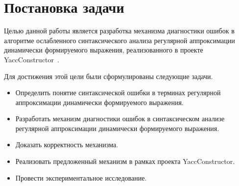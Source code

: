 \section{Постановка задачи}
Целью данной работы является разработка механизма диагностики ошибок в алгоритме ослабленного синтаксического анализа регулярной аппроксимации динамически формируемого выражения, реализованного в проекте YaccConstructor~\cite{YC}.

Для достижения этой цели были сформулированы следующие задачи.
\begin{itemize}
    \item Определить понятие синтаксической ошибки в терминах регулярной аппроксимации динамически формируемого выражения.
    \item Разработать механизм диагностики ошибок в синтаксическом анализе регулярной аппроксимации динамически формируемого выражения.
    \item Доказать корректность механизма.
    \item Реализовать предложенный механизм в рамках проекта \linebreak YaccConstructor.
    \item Провести экспериментальное исследование.
\end{itemize}